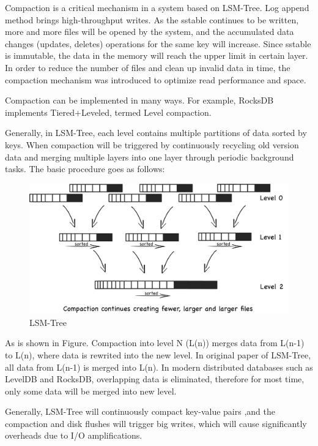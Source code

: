\documentclass[a4paper,10pt,twoside]{article}
\begin{document}
Compaction is a critical mechanism in a system based on LSM-Tree. 
Log append method brings high-throughput writes. 
As the sstable continues to be written, more and more files will be opened by the system, and the accumulated data changes (updates, deletes) operations for the same key will increase. 
Since sstable is immutable, the data in the memory will reach the upper limit in certain layer.
In order to reduce the number of files and clean up invalid data in time, the compaction mechanism was introduced to optimize read performance and space.
\par
Compaction can be implemented in many ways. For example, RocksDB implements Tiered+Leveled, termed Level compaction\cite{RocksDB_compaction_algo1}. 
\par
Generally, in LSM-Tree, each level contains multiple partitions of data sorted by keys. When  compaction will be triggered by continuously recycling old version data and merging multiple layers into one layer through periodic background tasks.
The basic procedure goes as follows:
\begin{figure}[h]
    \centering
	\includegraphics[scale=0.3]{LSM_Tree1.png}
    \caption{LSM-Tree}
    \label{fig:mesh1}
\end{figure}
\par
As is shown in Figure. Compaction into level N (L(n)) merges data from L(n-1) to L(n), where data is rewrited into the new level. 
In original paper of LSM-Tree, all data from L(n-1) is merged into L(n). 
In modern distributed databases such as LevelDB and RocksDB, overlapping data is eliminated, therefore for most time, only some data will be merged into new level.
\par
Generally, LSM-Tree will continuously compact key-value pairs ,and the compaction and disk flushes will trigger big writes, which will cause significantly overheads due to I/O amplifications.
\end{document}
